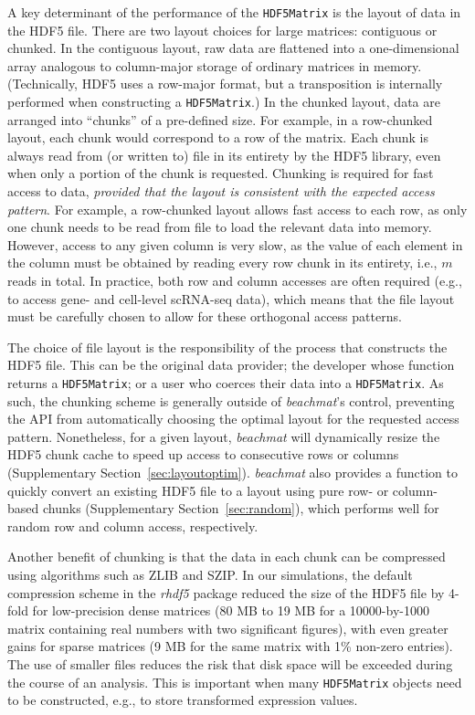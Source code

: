 \documentclass{article}
\newcommand{\beachmat}{\textit{beachmat}}
\newcommand{\code}[1]{\texttt{#1}}
\begin{document}
A key determinant of the performance of the \code{HDF5Matrix} is the layout of data in the HDF5 file.
There are two layout choices for large matrices: contiguous or chunked.
In the contiguous layout, raw data are flattened into a one-dimensional array analogous to column-major storage of ordinary matrices in memory.
(Technically, HDF5 uses a row-major format, but a transposition is internally performed when constructing a \code{HDF5Matrix}.)
In the chunked layout, data are arranged into ``chunks'' of a pre-defined size.
For example, in a row-chunked layout, each chunk would correspond to a row of the matrix.
Each chunk is always read from (or written to) file in its entirety by the HDF5 library, even when only a portion of the chunk is requested.
Chunking is required for fast access to data, \textit{provided that the layout is consistent with the expected access pattern}.
For example, a row-chunked layout allows fast access to each row, as only one chunk needs to be read from file to load the relevant data into memory.
However, access to any given column is very slow, as the value of each element in the column must be obtained by reading every row chunk in its entirety, i.e., $m$ reads in total.
In practice, both row and column accesses are often required (e.g., to access gene- and cell-level scRNA-seq data), which means that the file layout must be carefully chosen to allow for these orthogonal access patterns.

The choice of file layout is the responsibility of the process that constructs the HDF5 file.
This can be the original data provider; the developer whose function returns a \code{HDF5Matrix}; or a user who coerces their data into a \code{HDF5Matrix}.
As such, the chunking scheme is generally outside of \beachmat{}'s control, preventing the API from automatically choosing the optimal layout for the requested access pattern.
Nonetheless, for a given layout, \beachmat{} will dynamically resize the HDF5 chunk cache to speed up access to consecutive rows or columns (Supplementary Section~\ref{sec:layoutoptim}).
\beachmat{} also provides a function to quickly convert an existing HDF5 file to a layout using pure row- or column-based chunks (Supplementary Section~\ref{sec:random}), which performs well for random row and column access, respectively.

Another benefit of chunking is that the data in each chunk can be compressed using algorithms such as ZLIB and SZIP.
In our simulations, the default compression scheme in the \textit{rhdf5} package reduced the size of the HDF5 file by 4-fold for low-precision dense matrices (80 MB to 19 MB for a 10000-by-1000 matrix containing real numbers with two significant figures), with even greater gains for sparse matrices (9 MB for the same matrix with 1\% non-zero entries).
The use of smaller files reduces the risk that disk space will be exceeded during the course of an analysis.
This is important when many \code{HDF5Matrix} objects need to be constructed, e.g., to store transformed expression values.
\end{document}
